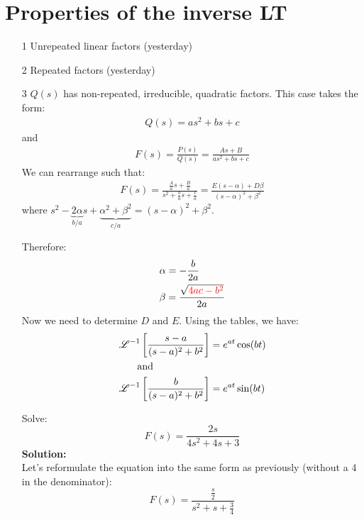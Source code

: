 \section*{Properties of the inverse LT}


\begin{itemize}
\item[1] Unrepeated linear factors (yesterday)
\item[2] Repeated factors (yesterday)
\item[3] $Q(s)$ has non-repeated, irreducible, quadratic factors. This case takes the form:
\begin{align*}
Q(s)=as^2+bs+c
\end{align*}
and 
\begin{align*}
F(s)=\frac{P(s)}{Q(s)}=\frac{As+B}{as^2+bs+c}
\end{align*}
We can rearrange such that:
\begin{align*}
F(s)=\frac{\frac{A}{a}s+\frac{B}{a}}{s^2+\frac{b}{a}s+\frac{c}{a}}=\frac{E(s-\alpha)+D\beta}{(s-\alpha)^2+\beta^2}
\end{align*}
where $s^2-\underbrace{2\alpha }_{b/a}s+\underbrace{\alpha^2+\beta^2}_{c/a}={(s-\alpha)^2+\beta^2}$.


Therefore:
\begin{align*}
&\alpha=-\frac{b}{2a}\\
&\beta=\frac{\sqrt{\textcolor{red}{4ac-b^2}}}{2a}
\end{align*}
Now we need to determine $D$ and $E$. Using the tables, we have:
\begin{align*}
&\operatorname{\mathscr{L}}^{-1}\left[\frac{s-a}{(s-a)^2+b^2}\right]=e^{at}\cos(bt)\\
&\qquad \text{and}\\
&\operatorname{\mathscr{L}}^{-1}\left[\frac{b}{(s-a)^2+b^2}\right]=e^{at}\sin(bt)
\end{align*}
\begin{exmp}{}
Solve:
\begin{equation*}
F(s)=\frac{2s}{4s^2+4s+3}
\end{equation*}
\textbf{Solution:}\\
Let's reformulate the equation into the same form as previously (without a 4 in the denominator):
\begin{equation*}
F(s)=\frac{\frac{s}{2}}{s^2+s+\frac{3}{4}}
\end{equation*}


\end{exmp}
\end{itemize}
